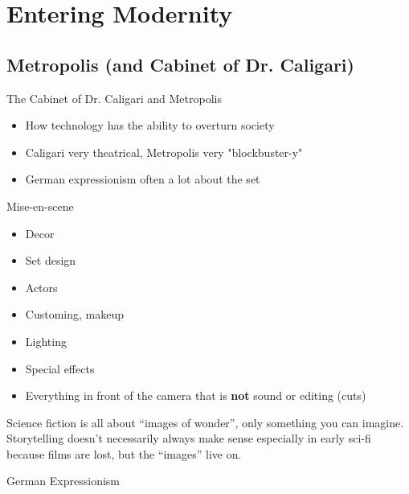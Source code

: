 \documentclass[11pt,fleqn]{book}
\begin{document}
\section{Entering Modernity}
\subsection{Metropolis (and Cabinet of Dr. Caligari)}
\begin{descriptions}
    \item[The Cabinet of Dr. Caligari and Metropolis]
    \begin{descriptions}
    \end{descriptions}
    \begin{itemize}
        \item How technology has the ability to overturn society
        \item Caligari very theatrical, Metropolis very "blockbuster-y"
        \item German expressionism often a lot about the set
    \end{itemize}
    \item[Mise-en-scene]
    \begin{descriptions}
    \end{descriptions}
    \begin{itemize}
        \item Decor
        \item Set design
        \item Actors
        \item Customing, makeup
        \item Lighting
        \item Special effects
        \item Everything in front of the camera that is \textbf{not} sound or editing (cuts)
    \end{itemize}
    \begin{remark}
        Science fiction is all about \enquote{images of wonder}, only something you can imagine.\\
        Storytelling doesn't necessarily always make sense especially in early sci-fi because films are lost, but the \enquote{images} live on.
    \end{remark}
    \item[German Expressionism]
    \begin{descriptions}
    \end{descriptions}
    \begin{itemize}

\end{itemize}
\end{descriptions}
\end{document}
